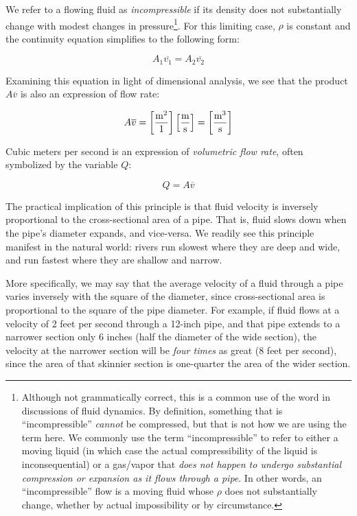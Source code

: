 \vskip 10pt

\filbreak

We refer to a flowing fluid as \textit{incompressible} if its density does not substantially change with modest changes in pressure\footnote{Although not grammatically correct, this is a common use of the word in discussions of fluid dynamics.  By definition, something that is ``incompressible'' \textit{cannot} be compressed, but that is not how we are using the term here.  We commonly use the term ``incompressible'' to refer to either a moving liquid (in which case the actual compressibility of the liquid is inconsequential) or a gas/vapor that \textit{does not happen to undergo substantial compression or expansion as it flows through a pipe}.  In other words, an ``incompressible'' flow is a moving fluid whose $\rho$ does not substantially change, whether by actual impossibility or by circumstance.}.  For this limiting case, $\rho$ is constant and the continuity equation simplifies to the following form:  

$$A_1 \overline{v_1} = A_2 \overline{v_2}$$

Examining this equation in light of dimensional analysis, we see that the product $A \overline{v}$ is also an expression of flow rate:  

$$A \overline{v} = \left[\hbox{m}^2 \over 1 \right] \left[\hbox{m} \over \hbox{s} \right] = \left[\hbox{m}^3 \over \hbox{s} \right]$$

Cubic meters per second is an expression of \textit{volumetric flow rate}, often symbolized by the variable $Q$:

$$Q = A \overline{v}$$

The practical implication of this principle is that fluid velocity is inversely proportional to the cross-sectional area of a pipe.  That is, fluid slows down when the pipe's diameter expands, and vice-versa.  We readily see this principle manifest in the natural world: rivers run slowest where they are deep and wide, and run fastest where they are shallow and narrow.  

More specifically, we may say that the average velocity of a fluid through a pipe varies inversely with the square of the diameter, since cross-sectional area is proportional to the square of the pipe diameter.  For example, if fluid flows at a velocity of 2 feet per second through a 12-inch pipe, and that pipe extends to a narrower section only 6 inches (half the diameter of the wide section), the velocity at the narrower section will be \textit{four times} as great (8 feet per second), since the area of that skinnier section is one-quarter the area of the wider section.

